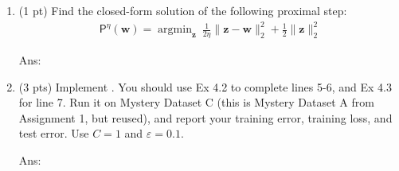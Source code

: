 \documentclass[10pt,letter,notitlepage]{article}
\newcommand{\argmin}{\mathop{\mathrm{argmin}}}
\newcommand{\wv}{\mathbf{w}}
\newcommand{\zv}{\mathbf{z}}
\newcommand{\red}[1]{{\color{red}#1}}
\newcommand{\ans}[1]{{\color{orange}\textsf{Ans}: #1}}
\newcounter{exercise}
\begin{document}
\begin{exercise}
\begin{enumerate}
	
\ans{} 

	
\item (1 pt) Find the closed-form solution of the following proximal step:
	\begin{align}
	\mathsf{P}^\eta(\wv) = \argmin_{\zv} ~ \frac{1}{2\eta} \|\zv - \wv\|_2^2 + \frac{1}{2} \|\zv\|_2^2
	\end{align}
	
	
\ans{} 

	
\item (3 pts) Implement . You should use Ex \red{4.2} to complete lines 5-6, and Ex \red{4.3} for line 7. 
Run it on Mystery Dataset C (this is Mystery Dataset A from Assignment 1, but reused), and report your training error, training loss, and test error. Use $C=1$ and $\varepsilon = 0.1$.

\ans{} 

\end{enumerate}
\end{exercise}
\end{document}
